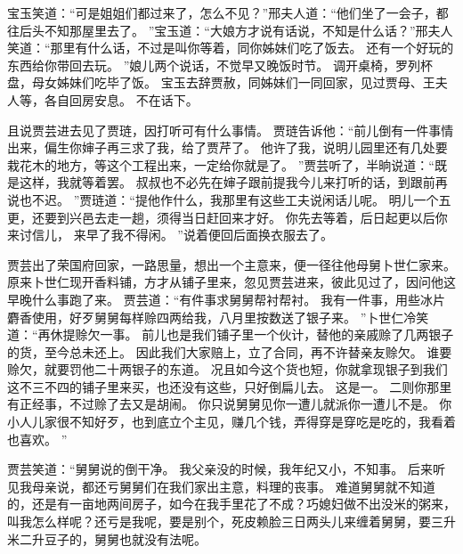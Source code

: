 \par
宝玉笑道：“可是姐姐们都过来了，怎么不见？”邢夫人道：“他们坐了一会子，都往后头不知那屋里去了。
”宝玉道：“大娘方才说有话说，不知是什么话？”邢夫人笑道：“那里有什么话，不过是叫你等着，同你姊妹们吃了饭去。
还有一个好玩的东西给你带回去玩。
”娘儿两个说话，不觉早又晚饭时节。
调开桌椅，罗列杯盘，母女姊妹们吃毕了饭。
宝玉去辞贾赦，同姊妹们一同回家，见过贾母、王夫人等，各自回房安息。
不在话下。
\par
且说贾芸进去见了贾琏，因打听可有什么事情。
贾琏告诉他：“前儿倒有一件事情出来，偏生你婶子再三求了我，给了贾芹了。
他许了我，说明儿园里还有几处要栽花木的地方，等这个工程出来，一定给你就是了。
”贾芸听了，半晌说道：“既是这样，我就等着罢。
叔叔也不必先在婶子跟前提我今儿来打听的话，到跟前再说也不迟。
”贾琏道：“提他作什么，我那里有这些工夫说闲话儿呢。
明儿一个五更，还要到兴邑去走一趟，须得当日赶回来才好。
你先去等着，后日起更以后你来讨信儿，
来早了我不得闲。
”说着便回后面换衣服去了。
\par
贾芸出了荣国府回家，一路思量，想出一个主意来，便一径往他母舅卜世仁家来。
原来卜世仁现开香料铺，方才从铺子里来，忽见贾芸进来，彼此见过了，因问他这早晚什么事跑了来。
贾芸道：“有件事求舅舅帮衬帮衬。
我有一件事，用些冰片麝香使用，好歹舅舅每样赊四两给我，八月里按数送了银子来。
”卜世仁冷笑道：“再休提赊欠一事。
前儿也是我们铺子里一个伙计，替他的亲戚赊了几两银子的货，至今总未还上。
因此我们大家赔上，立了合同，再不许替亲友赊欠。
谁要赊欠，就要罚他二十两银子的东道。
况且如今这个货也短，你就拿现银子到我们这不三不四的铺子里来买，也还没有这些，只好倒扁儿去。
这是一。
二则你那里有正经事，不过赊了去又是胡闹。
你只说舅舅见你一遭儿就派你一遭儿不是。
你小人儿家很不知好歹，也到底立个主见，赚几个钱，弄得穿是穿吃是吃的，我看着也喜欢。
”\par
贾芸笑道：“舅舅说的倒干净。
我父亲没的时候，我年纪又小，不知事。
后来听见我母亲说，都还亏舅舅们在我们家出主意，料理的丧事。
难道舅舅就不知道的，还是有一亩地两间房子，如今在我手里花了不成？巧媳妇做不出没米的粥来，叫我怎么样呢？还亏是我呢，要是别个，死皮赖脸三日两头儿来缠着舅舅，要三升米二升豆子的，舅舅也就没有法呢。
